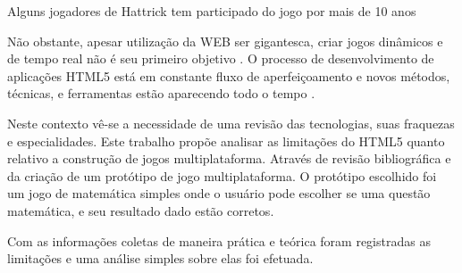 Alguns jogadores de Hattrick tem participado do jogo por mais de 
10 anos \autocite{gameCommunities}

Não obstante, apesar utilização da WEB ser gigantesca, criar
jogos dinâmicos e de tempo real não é seu primeiro objetivo
\autocite{html5mostwanted}. O processo de desenvolvimento de
aplicações HTML5 está em constante fluxo de aperfeiçoamento e novos
métodos, técnicas, e ferramentas estão aparecendo todo o tempo
\autocite{crossPlatformMobileGame}.

Neste contexto vê-se a necessidade de uma revisão das tecnologias,
suas fraquezas e especialidades. Este trabalho propõe analisar
as limitações do HTML5 quanto relativo a construção de jogos
multiplataforma. Através de revisão bibliográfica e da criação
de um protótipo de jogo multiplataforma. O protótipo escolhido foi
um jogo de matemática simples onde o usuário pode escolher se uma
questão matemática, e seu resultado dado estão corretos.

Com as informações coletas de maneira prática e teórica foram
registradas as limitações e uma análise simples sobre elas foi
efetuada.



